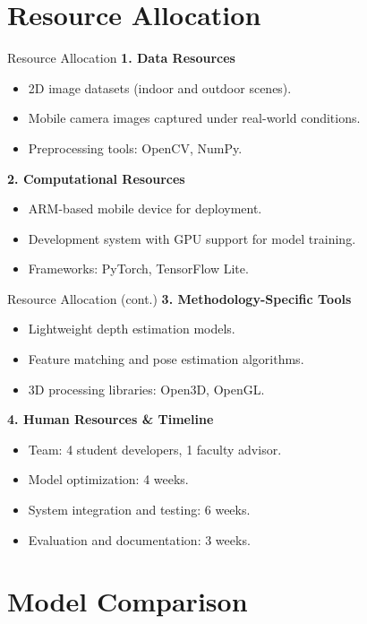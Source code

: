 \documentclass[11pt]{beamer}
\begin{document}
\section{Resource Allocation}

\begin{frame}{Resource Allocation}
\textbf{1. Data Resources}
\begin{itemize}
\item 2D image datasets (indoor and outdoor scenes).
\item Mobile camera images captured under real-world conditions.
\item Preprocessing tools: OpenCV, NumPy.
\end{itemize}

\medskip
\textbf{2. Computational Resources}
\begin{itemize}
\item ARM-based mobile device for deployment.
\item Development system with GPU support for model training.
\item Frameworks: PyTorch, TensorFlow Lite.
\end{itemize}
\end{frame}

\begin{frame}{Resource Allocation (cont.)}
\textbf{3. Methodology-Specific Tools}
\begin{itemize}
\item Lightweight depth estimation models.
\item Feature matching and pose estimation algorithms.
\item 3D processing libraries: Open3D, OpenGL.
\end{itemize}

\medskip
\textbf{4. Human Resources \& Timeline}
\begin{itemize}
\item Team: 4 student developers, 1 faculty advisor.
\item Model optimization: 4 weeks.
\item System integration and testing: 6 weeks.
\item Evaluation and documentation: 3 weeks.
\end{itemize}
\end{frame}

\section{Model Comparison}
\end{document}
